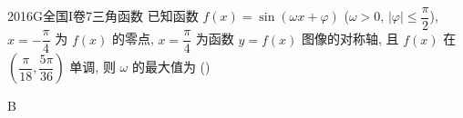 
\begin{problem}{2016}{G}{全国I卷}{7}{三角函数}
已知函数 $ f(x)=\sin(\omega x+\varphi) $ ($ \omega>0 $, $ |\varphi|\leqslant\dfrac{\pi}{2} $), $ x=-\dfrac{\pi}{4} $ 为 $ f(x) $ 的零点, $ x=\dfrac{\pi}{4} $ 为函数 $ y=f(x) $ 图像的对称轴, 且 $ f(x) $ 在 $ \left(\dfrac{\pi}{18},\dfrac{5\pi}{36}\right) $ 单调, 则 $ \omega $ 的最大值为 (\hspace{1cm})
\begin{choices}
\end{choices}
\end{problem}

\begin{answer}
B
\end{answer}

